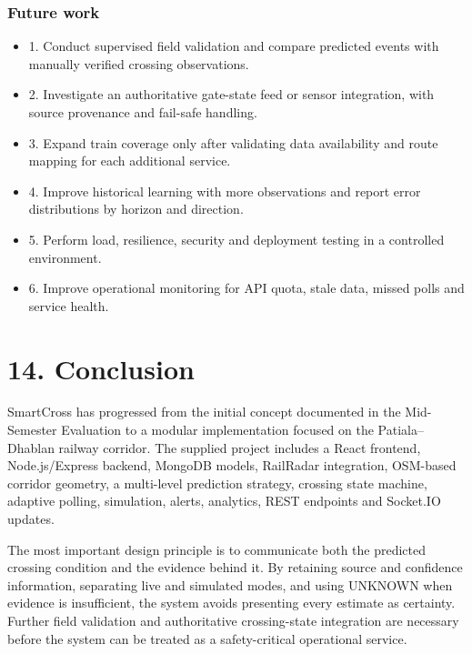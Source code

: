 \documentclass[12pt,a4paper]{report}
\begin{document}
\subsection{Future work}
\begin{itemize}\item 1. Conduct supervised field validation and compare predicted events with manually verified crossing observations.\end{itemize}
\begin{itemize}\item 2. Investigate an authoritative gate-state feed or sensor integration, with source provenance and fail-safe handling.\end{itemize}
\begin{itemize}\item 3. Expand train coverage only after validating data availability and route mapping for each additional service.\end{itemize}
\begin{itemize}\item 4. Improve historical learning with more observations and report error distributions by horizon and direction.\end{itemize}
\begin{itemize}\item 5. Perform load, resilience, security and deployment testing in a controlled environment.\end{itemize}
\begin{itemize}\item 6. Improve operational monitoring for API quota, stale data, missed polls and service health.\end{itemize}
\chapter{14. Conclusion}
SmartCross has progressed from the initial concept documented in the Mid-Semester Evaluation to a modular implementation focused on the Patiala--Dhablan railway corridor. The supplied project includes a React frontend, Node.js/Express backend, MongoDB models, RailRadar integration, OSM-based corridor geometry, a multi-level prediction strategy, crossing state machine, adaptive polling, simulation, alerts, analytics, REST endpoints and Socket.IO updates.

The most important design principle is to communicate both the predicted crossing condition and the evidence behind it. By retaining source and confidence information, separating live and simulated modes, and using UNKNOWN when evidence is insufficient, the system avoids presenting every estimate as certainty. Further field validation and authoritative crossing-state integration are necessary before the system can be treated as a safety-critical operational service.
\end{document}
